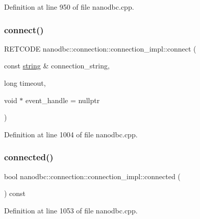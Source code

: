 Definition at line 950 of file nanodbc.\+cpp.

\mbox{\label{classnanodbc_1_1connection_1_1connection__impl_a424e8e3320aa5d89327509b10827b94c}} 
\subsubsection{\texorpdfstring{connect()}{connect()}\hspace{0.1cm}{\footnotesize\ttfamily [2/2]}}
{\footnotesize\ttfamily R\+E\+T\+C\+O\+DE nanodbc\+::connection\+::connection\+\_\+impl\+::connect (\begin{DoxyParamCaption}\item[{const \mbox{\hyperlink{namespacenanodbc_abfc0ece56278e590911ec8352774c212}{string}} \&}]{connection\+\_\+string,  }\item[{long}]{timeout,  }\item[{void $\ast$}]{event\+\_\+handle = {\ttfamily nullptr} }\end{DoxyParamCaption})\hspace{0.3cm}{\ttfamily [inline]}}



Definition at line 1004 of file nanodbc.\+cpp.

\mbox{\label{classnanodbc_1_1connection_1_1connection__impl_a07e1296c6fef6975a2e18960d7c4eaf8}} 
\subsubsection{\texorpdfstring{connected()}{connected()}}
{\footnotesize\ttfamily bool nanodbc\+::connection\+::connection\+\_\+impl\+::connected (\begin{DoxyParamCaption}{ }\end{DoxyParamCaption}) const\hspace{0.3cm}{\ttfamily [inline]}}



Definition at line 1053 of file nanodbc.\+cpp.

